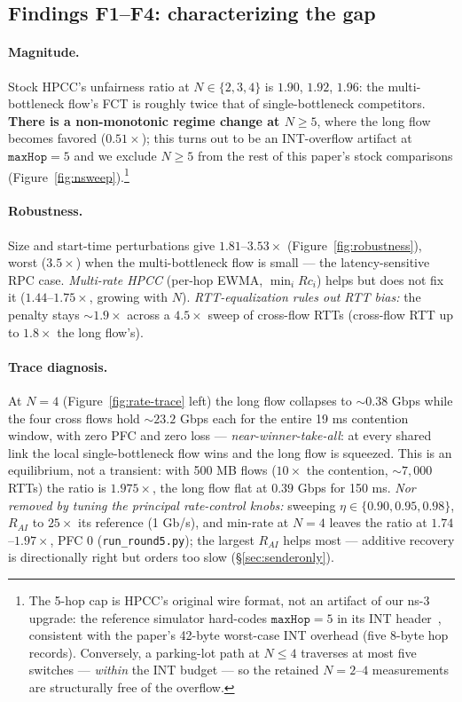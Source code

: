 \documentclass[sigconf, nonacm]{acmart}
\begin{document}
\subsection{Findings F1--F4: characterizing the gap}

\paragraph{Magnitude.} Stock HPCC's unfairness ratio at $N \in \{2, 3, 4\}$ is $1.90$, $1.92$,
$1.96$: the multi-bottleneck flow's FCT is roughly twice that of single-bottleneck competitors.
\textbf{There is a non-monotonic regime change at $N \ge 5$}, where the long flow becomes
favored ($0.51\times$); this turns out to be an INT-overflow artifact at $\texttt{maxHop} = 5$
and we exclude $N \ge 5$ from the rest of this paper's stock comparisons
(Figure~\ref{fig:nsweep}).\footnote{The 5-hop cap is HPCC's original wire format, not an
artifact of our ns-3 upgrade: the reference simulator hard-codes $\texttt{maxHop}=5$ in its INT
header~\cite{hpccrepo}, consistent with the paper's 42-byte worst-case INT overhead (five
8-byte hop records). Conversely, a parking-lot path at $N \le 4$ traverses at most five
switches --- \emph{within} the INT budget --- so the retained $N = 2$--$4$ measurements are
structurally free of the overflow.}

\paragraph{Robustness.} Size and start-time perturbations give $1.81$--$3.53\times$
(Figure~\ref{fig:robustness}), worst ($3.5\times$) when the multi-bottleneck flow is small ---
the latency-sensitive RPC case. \emph{Multi-rate HPCC} (per-hop EWMA, $\min_i Rc_i$) helps but
does not fix it ($1.44$--$1.75\times$, growing with $N$). \emph{RTT-equalization rules out RTT
bias:} the penalty stays ${\sim}1.9\times$ across a $4.5\times$ sweep of cross-flow RTTs
(cross-flow RTT up to $1.8\times$ the long flow's).

\paragraph{Trace diagnosis.} At $N = 4$ (Figure~\ref{fig:rate-trace} left) the long flow
collapses to ${\sim}0.38$ Gbps while the four cross flows hold ${\sim}23.2$ Gbps each for the
entire 19 ms contention window, with zero PFC and zero loss --- \emph{near-winner-take-all}: at every
shared link the local single-bottleneck flow wins and the long flow is squeezed. This is an
equilibrium, not a transient: with 500 MB flows ($10\times$ the contention, ${\sim}7{,}000$
RTTs) the ratio is $1.975\times$, the long flow flat at $0.39$ Gbps for 150 ms.
\emph{Nor removed by tuning the principal rate-control knobs:} sweeping $\eta \in \{0.90, 0.95, 0.98\}$, $R_{AI}$ to
$25\times$ its reference (1 Gb/s), and min-rate at $N{=}4$ leaves the ratio at $1.74$--$1.97\times$, PFC $0$ (\texttt{run\_round5.py});
the largest $R_{AI}$ helps most --- additive recovery is directionally right but orders too
slow (\S\ref{sec:senderonly}).
\end{document}
